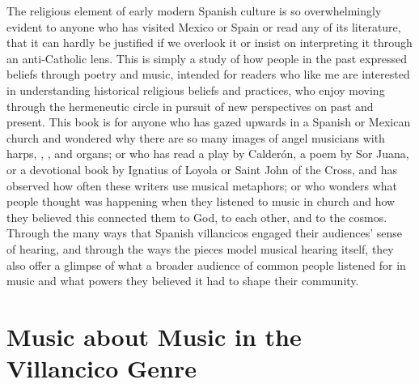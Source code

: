 The religious element of early modern Spanish culture is so overwhelmingly
evident to anyone who has visited Mexico or Spain or read any of its
literature, that it can hardly be justified if we overlook it or insist on
interpreting it through an anti-Catholic lens.
This is simply a study of how people in the past expressed beliefs through
poetry and music, intended for readers who like me are interested in
understanding historical religious beliefs and practices, who enjoy moving
through the hermeneutic circle in pursuit of new perspectives on past and
present.%
    \citXXX[ricoeur]
This book is for anyone who has gazed upwards in a Spanish or Mexican church
and wondered why there are so many images of angel musicians with harps,
, , and organs; or who has read a play by
Calderón, a poem by Sor Juana, or a devotional book by Ignatius of Loyola or
Saint John of the Cross, and has observed how often these writers use musical
metaphors; or who wonders what people thought was happening when they listened
to music in church and how they believed this connected them to God, to each
other, and to the cosmos.
Through the many ways that Spanish villancicos engaged their audiences' sense
of hearing, and through the ways the pieces model musical hearing itself, they
also offer a glimpse of what a broader audience of common people listened for
in music and what powers they believed it had to shape their community.

\section{Music about Music in the Villancico Genre}

